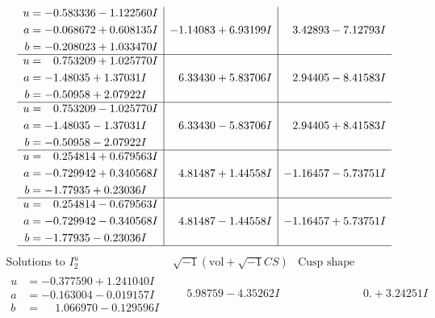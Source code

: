 \documentclass[1p]{elsarticle_modified}
\theoremstyle{definition}
\newcommand{\I}{\sqrt{-1}}
\begin{document}
$$\begin{array}{c|c|c}
\begin{aligned}
u &= -0.583336 - 1.122560 I \\
a &= -0.068672 + 0.608135 I \\
b &= -0.208023 + 1.033470 I\end{aligned}
 & -1.14083 + 6.93199 I & \phantom{-}3.42893 - 7.12793 I \\ \hline\begin{aligned}
u &= \phantom{-}0.753209 + 1.025770 I \\
a &= -1.48035 + 1.37031 I \\
b &= -0.50958 + 2.07922 I\end{aligned}
 & \phantom{-}6.33430 + 5.83706 I & \phantom{-}2.94405 - 8.41583 I \\ \hline\begin{aligned}
u &= \phantom{-}0.753209 - 1.025770 I \\
a &= -1.48035 - 1.37031 I \\
b &= -0.50958 - 2.07922 I\end{aligned}
 & \phantom{-}6.33430 - 5.83706 I & \phantom{-}2.94405 + 8.41583 I \\ \hline\begin{aligned}
u &= \phantom{-}0.254814 + 0.679563 I \\
a &= -0.729942 + 0.340568 I \\
b &= -1.77935 + 0.23036 I\end{aligned}
 & \phantom{-}4.81487 + 1.44558 I & -1.16457 - 5.73751 I \\ \hline\begin{aligned}
u &= \phantom{-}0.254814 - 0.679563 I \\
a &= -0.729942 - 0.340568 I \\
b &= -1.77935 - 0.23036 I\end{aligned}
 & \phantom{-}4.81487 - 1.44558 I & -1.16457 + 5.73751 I\\
 \hline 
 \end{array}$$\newpage$$\begin{array}{c|c|c}  
\text{Solutions to }I^u_{2}& \I (\text{vol} + \sqrt{-1}CS) & \text{Cusp shape}\\
 \hline 
\begin{aligned}
u &= -0.377590 + 1.241040 I \\
a &= -0.163004 - 0.019157 I \\
b &= \phantom{-}1.066970 - 0.129596 I\end{aligned}
 & \phantom{-}5.98759 - 4.35262 I & \phantom{-0.000000 -}0. + 3.24251 I \\ \hline\begin{aligned}

\end{aligned}
\end{array}$$
\end{document}
